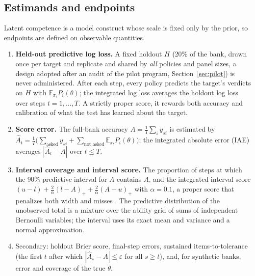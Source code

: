 \subsection{Estimands and endpoints}
Latent competence is a model construct whose scale is fixed only by the prior,
so endpoints are defined on observable quantities.
\begin{enumerate}\itemsep0pt
\item \textbf{Held-out predictive log loss.} A fixed holdout $H$ (20\% of the
bank, drawn once per target and replicate and shared by \emph{all} policies and
panel sizes, a design adopted after an audit of the pilot program, Section~\ref{sec:pilot}) is never
administered. After each step, every policy predicts the target's verdicts on
$H$ with $\mathbb E_{\pi_t}P_i(\theta)$; the integrated log loss averages the
holdout log loss over steps $t=1,\dots,T$. A strictly proper score, it rewards
both accuracy and calibration of what the test has learned about the target.
\item \textbf{Score error.} The full-bank accuracy $A=\frac1I\sum_iy_{si}$ is
estimated by $\hat A_t=\frac1I\big(\sum_{\text{asked}}y_{si}+\sum_{\text{not asked}}\mathbb E_{\pi_t}P_i(\theta)\big)$;
the integrated absolute error (IAE) averages $|\hat A_t-A|$ over $t\le T$.
\item \textbf{Interval coverage and interval score.} The proportion of steps at which
the 90\% predictive interval for $A$ contains $A$, and the integrated interval score
$(u-l)+\frac2\alpha(l-A)_++\frac2\alpha(A-u)_+$ with $\alpha=0.1$, a proper score that
penalizes both width and misses \citep{gneiting2007strictly}. The predictive distribution of
the unobserved total is a mixture over the ability grid of sums of independent Bernoulli
variables; the interval uses its exact mean and variance and a normal approximation.
\item Secondary: holdout Brier score, final-step errors, sustained items-to-tolerance
(the first $t$ after which $|\hat A_s-A|\le\varepsilon$ for all $s\ge t$), and, for
synthetic banks, error and coverage of the true $\theta$.
\end{enumerate}

